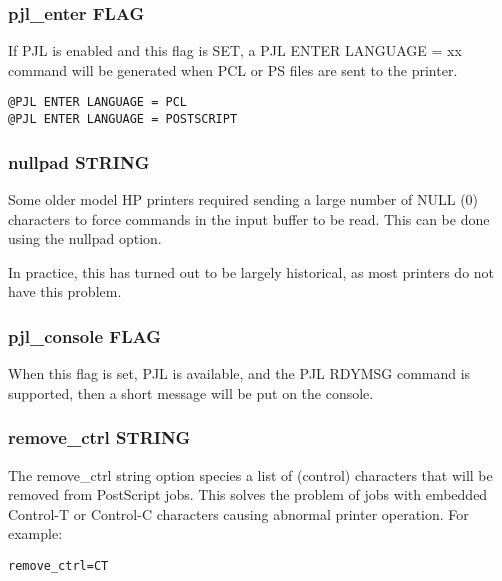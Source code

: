 \documentclass[a4paper]{article}
\begin{document}
\subsubsection{pjl\_enter FLAG
\label{pjl_enter}}

If PJL is enabled and this flag is SET,
a PJL ENTER LANGUAGE = xx command will be generated
when PCL or PS files are sent to the printer.
\begin{tscreen}
\begin{verbatim}
@PJL ENTER LANGUAGE = PCL
@PJL ENTER LANGUAGE = POSTSCRIPT
\end{verbatim}
\end{tscreen}



\subsubsection{nullpad STRING
\label{nullpad}}

Some older model HP printers required sending a large number of
NULL (0) characters to force commands in the input buffer to be read.
This can be done using the
{\ttfamily nullpad} option.

In practice,
this has turned out to be largely historical,
as most printers do not have this problem.


\subsubsection{pjl\_console FLAG
\label{pjl_console}}

When this flag is set,
PJL is available,
and the PJL
{\ttfamily RDYMSG}
command is supported,
then a short message will be put on the console.


\subsubsection{remove\_ctrl STRING
\label{remove_ctrl}}

The
{\ttfamily remove\_ctrl} string option species a list of (control) characters
that will be removed from PostScript jobs.
This solves the problem of jobs with embedded Control-T or Control-C
characters causing abnormal printer operation.
For example:
\begin{tscreen}
\begin{verbatim}
remove_ctrl=CT
\end{verbatim}
\end{tscreen}
\end{document}

